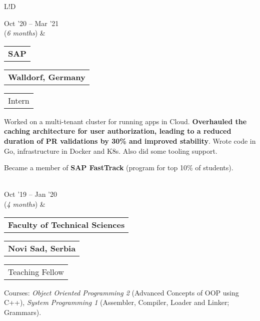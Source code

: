 \documentclass[11pt]{article}
\makeatletter
\newcommand{\VRule}{\color{lightgray}\vrule width 0.5pt}
\newcommand{\educationentry}[5][0.25em]{
	\begin{tabular}{@{}l} %
		{\bfseries #3}	%
	\end{tabular}
	\hfill
	\begin{tabular}{l@{}}
		{\bfseries #4} %
	\end{tabular} 
	\newline
	\begin{tabular}{@{}l}
		{#2}
	\end{tabular}
	\vspace{0.5em}
	#5
}
\newcommand{\timelinetable}[1]{
	\begin{tabular}{L!{\VRule}D}
		#1
	\end{tabular}
	\\[0.4em]
}
\makeatother
\begin{document}
\timelinetable{
	Oct '20 -- Mar '21 \\ (\small \textit{6 months}) &	\educationentry{Intern}{SAP}{Walldorf, Germany}{\newline
Worked on a multi-tenant cluster for running apps in Cloud. 
 \textbf{Overhauled the caching architecture for user authorization, 
 leading to a reduced duration of PR validations by 30\% and improved stability}.
Wrote code in Go, infrastructure in Docker and K8s. Also did some
tooling support.

\vspace{0.5em}
Became a member of {\bfseries SAP FastTrack} (program for top 10\% of students).
}

\\
    Oct '19 -- Jan '20 \\ (\small \textit{4 months}) & \educationentry{Teaching Fellow}{Faculty of Technical Sciences}{Novi Sad, Serbia}{\newline 
Courses: \textit{Object Oriented Programming 2} (Advanced Concepts of OOP using C++), 
\textit{System Programming 1} (Assembler, Compiler, Loader and Linker; Grammars).
}
}
\end{document}
